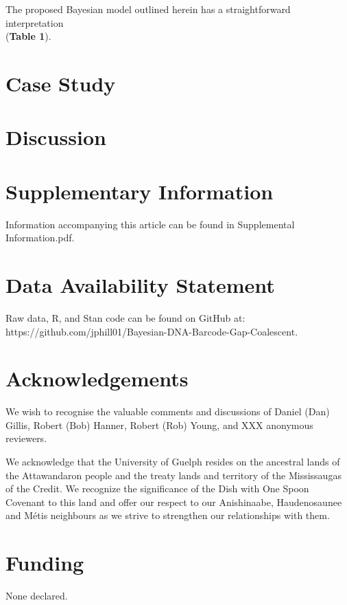 \documentclass[12pt]{article}
\begin{document}
The proposed Bayesian model outlined herein has a straightforward interpretation \\ (\textbf{Table 1}). 

\section{Case Study}

\section{Discussion}


\newpage

\section*{Supplementary Information}

Information accompanying this article can be found in Supplemental Information.pdf.

\section*{Data Availability Statement}

Raw data, R, and Stan code can be found on GitHub at: \\ https://github.com/jphill01/Bayesian-DNA-Barcode-Gap-Coalescent.

\section*{Acknowledgements}

We wish to recognise the valuable comments and discussions of Daniel (Dan) Gillis, Robert (Bob) Hanner, Robert (Rob) Young, and XXX anonymous reviewers.

We acknowledge that the University of Guelph resides on the ancestral lands of the Attawandaron people and the treaty lands and territory of the Mississaugas of the Credit. We recognize the significance of the Dish with One Spoon Covenant to this land and offer our respect to our Anishinaabe, Haudenosaunee and M{\'e}tis neighbours as we strive to strengthen our relationships with them.

\section*{Funding}

None declared.
\end{document}
